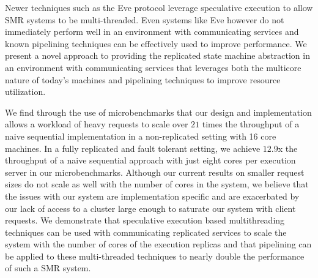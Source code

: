\documentclass[11pt, oneside]{report}
\begin{document}
Newer techniques such as the Eve protocol \cite{eve} leverage speculative execution to allow SMR systems to be multi-threaded.
Even systems like Eve however do not immediately perform well in an environment with communicating services and known pipelining techniques can be effectively used to improve performance.
We present a novel approach to providing the replicated state machine abstraction in an environment with communicating services that leverages both the multicore nature of today's machines and pipelining techniques to improve resource utilization. 

We find through the use of microbenchmarks that our design and implementation allows a workload of heavy requests to scale over $21$ times the throughput of a naive sequential implementation in a non-replicated setting with 16 core machines.
In a fully replicated and fault tolerant setting, we achieve $12.9$x the throughput of a naive sequential approach with just eight cores per execution server in our microbenchmarks.
Although our current results on smaller request sizes do not scale as well with the number of cores in the system, we believe that the issues with our system are implementation specific and are exacerbated by our lack of access to a cluster large enough to saturate our system with client requests.
We demonstrate that speculative execution based multithreading techniques can be used with communicating replicated services to scale the system with the number of cores of the execution replicas and that pipelining can be applied to these multi-threaded techniques to nearly double the performance of such a SMR system.



\end{document}
